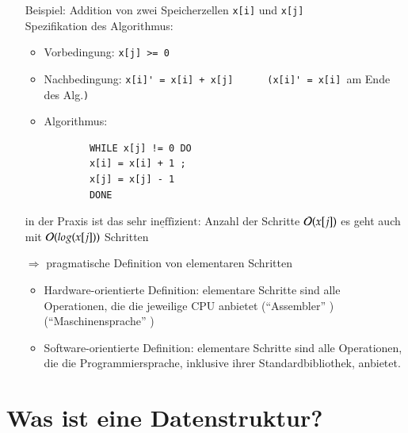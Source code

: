 \begin{itemize}[label={–}]
    Beispiel: Addition von zwei Speicherzellen \verb|x[i]| und \verb|x[j]| \\
    Spezifikation des Algorithmus: \\
    \vspace{-12mm}
    \begin{singlespace}
    \begin{itemize}[label={-}]
        \item Vorbedingung: \verb|x[j] >= 0| \\
        \item Nachbedingung: \verb|x[i]' = x[i] + x[j]      (x[i]' = x[i] |am Ende des Alg.\verb|)|
        \item Algorithmus:      \begin{verbatim}
        WHILE x[j] != 0 DO
        x[i] = x[i] + 1 ;
        x[j] = x[j] - 1
        DONE
                                                \end{verbatim}
    \end{itemize}
    \end{singlespace}

in der Praxis ist das $\underline{\text{sehr ineffizient}}$: Anzahl der Schritte $\mathcal{O}{}(x[j])$ es geht auch mit $\mathcal{O}{}(log(x[j]))$ Schritten

    \item[$\Rightarrow$] pragmatische Definition von elementaren Schritten
    \begin{itemize}[label={-}]
        \item Hardware-orientierte Definition: elementare Schritte sind alle Operationen, die die jeweilige CPU anbietet (``Assembler'' ) (``Maschinensprache'' )
        \item Software-orientierte Definition: elementare Schritte sind alle Operationen, die die Programmiersprache, inklusive ihrer Standardbibliothek, anbietet.
    \end{itemize}

\end{itemize}

\section{Was ist eine Datenstruktur?}


